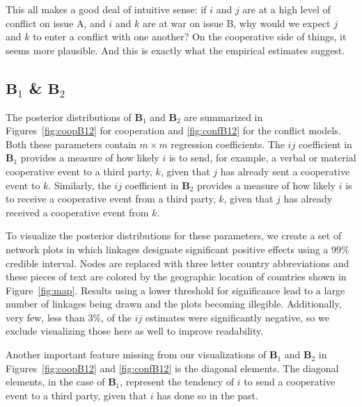 \documentclass[3p,times,twocolumn,authoryear,12pt]{elsarticle}
\newcommand{\bl}[1]{{\mathbf #1}}
\begin{document}
This all makes a good deal of intuitive sense: if $i$ and $j$ are at a high level of conflict on issue A, and $i$ and $k$ are at war on issue B, why would we expect $j$ and $k$ to enter a conflict with one another? On the cooperative side of things, it seems more plausible. And this is exactly what the empirical estimates suggest.

\subsection{$\bl B_{1}$ \& $\bl B_{2}$}

The posterior distributions of $\bl B_{1}$ and $\bl B_{2}$ are summarized in Figures~\ref{fig:coopB12} for cooperation and \ref{fig:confB12} for the conflict models. Both these parameters contain $m \times m$ regression coefficients. The $ij$ coefficient in $\bl B_{1}$ provides a measure of how likely $i$ is to send, for example, a verbal or material cooperative event to a third party, $k$, given that $j$ has already sent a cooperative event to $k$. Similarly, the $ij$ coefficient in $\bl B_{2}$ provides a measure of how likely $i$ is to receive a cooperative event from a third party, $k$, given that $j$ has already received a cooperative event from $k$. 

To visualize the posterior distributions for these parameters, we create a set of network plots in which linkages designate significant positive effects using a 99\% credible interval. Nodes are replaced with three letter country abbreviations and these pieces of text are colored by the geographic location of countries shown in Figure~\ref{fig:map}. Results using a lower threshold for significance lead to a large number of linkages being drawn and the plots becoming illegible. Additionally, very few, less than 3\%, of the $ij$ estimates were significantly negative, so we exclude visualizing those here as well to improve readability. 

Another important feature missing from our visualizations of $\bl B_{1}$ and $\bl B_{2}$ in Figures~\ref{fig:coopB12} and \ref{fig:confB12} is the diagonal elements. The diagonal elements, in the case of $\bl B_{1}$, represent the tendency of $i$ to send a cooperative event to a third party, given that $i$ has done so in the past. 
\end{document}
